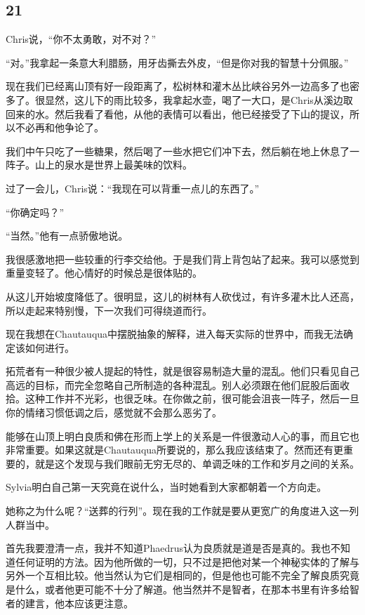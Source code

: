 \documentclass[UTF8]{article}
\begin{document}
\subsection*{21}
\par Chris说，“你不太勇敢，对不对？”
\par “对。”我拿起一条意大利腊肠，用牙齿撕去外皮，“但是你对我的智慧十分佩服。”
\par 现在我们已经离山顶有好一段距离了，松树林和灌木丛比峡谷另外一边高多了也密多了。很显然，这儿下的雨比较多，我拿起水壶，喝了一大口，是Chris从溪边取回来的水。然后我看了看他，从他的表情可以看出，他已经接受了下山的提议，所以不必再和他争论了。
\par 我们中午只吃了一些糖果，然后喝了一些水把它们冲下去，然后躺在地上休息了一阵子。山上的泉水是世界上最美味的饮料。
\par 过了一会儿，Chris说：“我现在可以背重一点儿的东西了。”
\par “你确定吗？”
\par “当然。”他有一点骄傲地说。
\par 我很感激地把一些较重的行李交给他。于是我们背上背包站了起来。我可以感觉到重量变轻了。他心情好的时候总是很体贴的。
\par 从这儿开始坡度降低了。很明显，这儿的树林有人砍伐过，有许多灌木比人还高，所以走起来特别慢，下一次我们可得绕道而行。
\par 现在我想在Chautauqua中摆脱抽象的解释，进入每天实际的世界中，而我无法确定该如何进行。
\par 拓荒者有一种很少被人提起的特性，就是很容易制造大量的混乱。他们只看见自己高远的目标，而完全忽略自己所制造的各种混乱。别人必须跟在他们屁股后面收拾。这种工作并不光彩，也很乏味。在你做之前，很可能会沮丧一阵子，然后一旦你的情绪习惯低调之后，感觉就不会那么恶劣了。
\par 能够在山顶上明白良质和佛在形而上学上的关系是一件很激动人心的事，而且它也非常重要。如果这就是Chautauqua所要说的，那么我应该结束了。然而还有更重要的，就是这个发现与我们眼前无穷无尽的、单调乏味的工作和岁月之间的关系。
\par Sylvia明白自己第一天究竟在说什么，当时她看到大家都朝着一个方向走。
\par 她称之为什么呢？“送葬的行列”。现在我的工作就是要从更宽广的角度进入这一列人群当中。
\par 首先我要澄清一点，我并不知道Phaedrus认为良质就是道是否是真的。我也不知道任何证明的方法。因为他所做的一切，只不过是把他对某一个神秘实体的了解与另外一个互相比较。他当然认为它们是相同的，但是他也可能不完全了解良质究竟是什么，或者他更可能不十分了解道。他当然并不是智者，在那本书里有许多给智者的建言，他本应该更注意。
\end{document}
